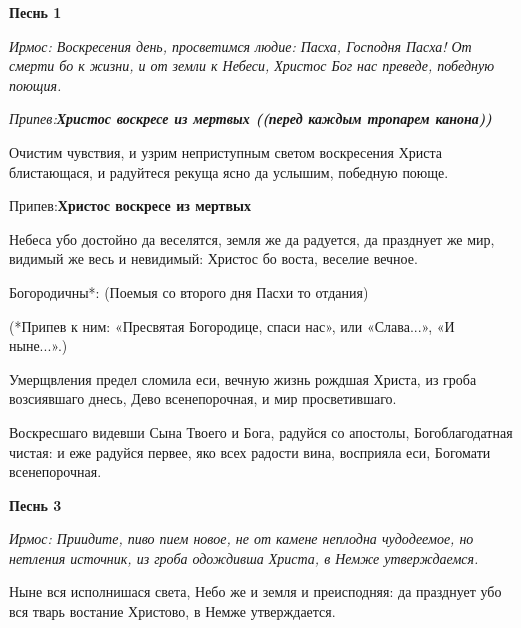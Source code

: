 

\label{_content_pesnopeniya-izsluzhb-triodi-cvetnoy}

 

 
\bfseries Песнь 1 

\normalfont{}\itshape Ирмос\normalfont{}: Воскресения день, просветимся людие: Пасха, Господня Пасха! От смерти бо к жизни, и от земли к Небеси, Христос Бог нас преведе, победную поющия. 

\itshape Припев\normalfont{}:\bfseries  Христос воскресе из мертвых\normalfont{} ((перед каждым тропарем канона))



Очистим чувствия, и узрим неприступным светом воскресения Христа блистающася, и радуйтеся рекуща ясно да услышим, победную поюще. \itshape 

Припев\normalfont{}:\bfseries  Христос воскресе из мертвых\normalfont{} 





Небеса убо достойно да веселятся, земля же да радуется, да празднует же мир, видимый же весь и невидимый: Христос бо воста, веселие вечное. \itshape 

Богородичны*:  (Поемыя со второго дня Пасхи то отдания) \normalfont{}

(*Припев к ним: «Пресвятая Богородице, спаси нас», или «Слава...», «И ныне...».)

Умерщвления предел сломила еси, вечную жизнь рождшая Христа, из гроба возсиявшаго днесь, Дево всенепорочная, и мир просветившаго.     



Воскресшаго видевши Сына Твоего и Бога, радуйся со апостолы, Богоблагодатная чистая: и еже радуйся первее, яко всех радости вина, восприяла еси, Богомати всенепорочная. 

\medskip\bfseries Песнь 3 

\normalfont{}\itshape Ирмос\normalfont{}: Приидите, пиво пием новое, не от камене неплодна чудодеемое, но нетления источник, из гроба одождивша Христа, в Немже утверждаемся. 



Ныне вся исполнишася света, Небо же и земля и преисподняя: да празднует убо вся тварь востание Христово, в Немже утверждается. 




